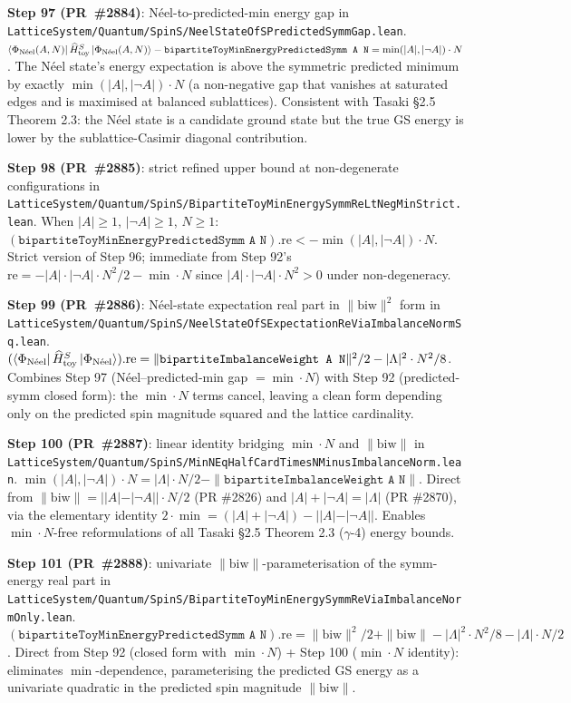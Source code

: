\documentclass[a4paper,11pt]{article}
\begin{document}
\textbf{Step 97 (PR~\#2884)}: Néel-to-predicted-min energy gap in
\texttt{LatticeSystem/Quantum/SpinS/NeelStateOfSPredictedSymmGap.lean}.
$\langle\Phi_{\rm N\acute{e}el}(A,N) |\, \widehat H_{\rm toy}^S\,
   | \Phi_{\rm N\acute{e}el}(A,N)\rangle
   - \texttt{bipartiteToyMinEnergyPredictedSymm A N}
   = \min(|A|, |\neg A|)\cdot N$.
The N\'eel state's energy expectation is above the symmetric
predicted minimum by exactly $\min(|A|,|\neg A|)\cdot N$ (a
non-negative gap that vanishes at saturated edges and is maximised
at balanced sublattices). Consistent with Tasaki §2.5 Theorem 2.3:
the N\'eel state is a candidate ground state but the true GS energy
is lower by the sublattice-Casimir diagonal contribution.

\textbf{Step 98 (PR~\#2885)}: strict refined upper bound at
non-degenerate configurations in
\texttt{LatticeSystem/Quantum/SpinS/BipartiteToyMinEnergySymmReLtNegMinStrict.lean}.
When $|A| \ge 1$, $|\neg A| \ge 1$, $N \ge 1$:
$(\texttt{bipartiteToyMinEnergyPredictedSymm A N}).\mathrm{re}
   < -\min(|A|, |\neg A|)\cdot N$.
Strict version of Step 96; immediate from Step 92's
$\mathrm{re} = -|A|\cdot|\neg A|\cdot N^2/2 - \min\cdot N$ since
$|A|\cdot|\neg A|\cdot N^2 > 0$ under non-degeneracy.

\textbf{Step 99 (PR~\#2886)}: Néel-state expectation real part in
$\|\mathrm{biw}\|^2$ form in
\texttt{LatticeSystem/Quantum/SpinS/NeelStateOfSExpectationReViaImbalanceNormSq.lean}.
$(\langle\Phi_{\rm N\acute{e}el} |\, \widehat H_{\rm toy}^S\,
   | \Phi_{\rm N\acute{e}el}\rangle).\mathrm{re}
   = \|\texttt{bipartiteImbalanceWeight A N}\|^2/2
   - |\Lambda|^2\cdot N^2/8$.
Combines Step 97 (Néel--predicted-min gap $= \min\cdot N$) with
Step 92 (predicted-symm closed form): the $\min\cdot N$ terms cancel,
leaving a clean form depending only on the predicted spin magnitude
squared and the lattice cardinality.

\textbf{Step 100 (PR~\#2887)}: linear identity bridging $\min\cdot N$
and $\|\mathrm{biw}\|$ in
\texttt{LatticeSystem/Quantum/SpinS/MinNEqHalfCardTimesNMinusImbalanceNorm.lean}.
$\min(|A|, |\neg A|)\cdot N = |\Lambda|\cdot N/2 -
   \|\texttt{bipartiteImbalanceWeight A N}\|$.
Direct from $\|\mathrm{biw}\| = ||A|{-}|\neg A||\cdot N/2$
(PR \#2826) and $|A|+|\neg A| = |\Lambda|$ (PR \#2870), via the
elementary identity $2\cdot\min = (|A|+|\neg A|) - ||A|{-}|\neg A||$.
Enables $\min\cdot N$-free reformulations of all Tasaki §2.5
Theorem 2.3 ($\gamma$-4) energy bounds.

\textbf{Step 101 (PR~\#2888)}: univariate $\|\mathrm{biw}\|$-parameterisation
of the symm-energy real part in
\texttt{LatticeSystem/Quantum/SpinS/BipartiteToyMinEnergySymmReViaImbalanceNormOnly.lean}.
$(\texttt{bipartiteToyMinEnergyPredictedSymm A N}).\mathrm{re}
   = \|\mathrm{biw}\|^2/2 + \|\mathrm{biw}\|
   - |\Lambda|^2\cdot N^2/8 - |\Lambda|\cdot N/2$.
Direct from Step 92 (closed form with $\min\cdot N$) + Step 100
($\min\cdot N$ identity): eliminates $\min$-dependence,
parameterising the predicted GS energy as a univariate quadratic
in the predicted spin magnitude $\|\mathrm{biw}\|$.
\end{document}
